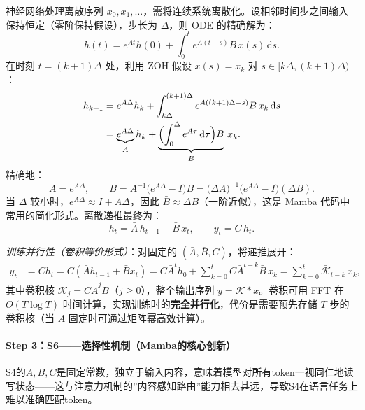 \documentclass[12pt,a4paper]{article}
\begin{document}
神经网络处理离散序列 $x_0, x_1, \ldots$，需将连续系统离散化。设相邻时间步之间输入保持恒定（零阶保持假设），步长为 $\Delta$，则 ODE 的精确解为：
\begin{equation}
h(t) = e^{At} h(0) + \int_0^t e^{A(t-s)} B\, x(s)\,\mathrm{d}s.
\end{equation}
在时刻 $t = (k+1)\Delta$ 处，利用 ZOH 假设 $x(s) = x_k$ 对 $s \in [k\Delta, (k+1)\Delta)$：
\begin{align}
h_{k+1} &= e^{A\Delta} h_k + \int_{k\Delta}^{(k+1)\Delta} e^{A((k+1)\Delta - s)} B\, x_k\,\mathrm{d}s\\
&= \underbrace{e^{A\Delta}}_{\bar{A}} h_k + \underbrace{\Bigl(\int_0^{\Delta} e^{A\tau}\,\mathrm{d}\tau\Bigr) B}_{\bar{B}}\, x_k.
\end{align}
精确地：
\begin{equation}
\bar{A} = e^{A\Delta},\qquad
\bar{B} = A^{-1}\bigl(e^{A\Delta} - I\bigr) B = \bigl(\Delta A\bigr)^{-1}\bigl(e^{A\Delta} - I\bigr)(\Delta B).
\end{equation}
当 $\Delta$ 较小时，$e^{A\Delta} \approx I + A\Delta$，因此 $\bar{B} \approx \Delta B$（一阶近似），这是 Mamba 代码中常用的简化形式。离散递推最终为：
\begin{equation}
\boxed{h_t = \bar{A}\, h_{t-1} + \bar{B}\, x_t,\qquad y_t = C\, h_t.}
\end{equation}

\textit{训练并行性（卷积等价形式）}：对固定的 $(\bar{A}, \bar{B}, C)$，将递推展开：
\begin{align}
y_t &= C h_t = C(\bar{A} h_{t-1} + \bar{B} x_t)
= C\bar{A}^t h_0 + \sum_{k=0}^{t} C\bar{A}^{t-k} \bar{B}\, x_k
= \sum_{k=0}^{t} \bar{\mathcal{K}}_{t-k}\, x_k,
\end{align}
其中卷积核 $\bar{\mathcal{K}}_j = C\bar{A}^j\bar{B}$（$j \ge 0$），整个输出序列 $y = \bar{\mathcal{K}} * x$。卷积可用 FFT 在 $O(T\log T)$ 时间计算，实现训练时的\textbf{完全并行化}，代价是需要预先存储 $T$ 步的卷积核（当 $\bar{A}$ 固定时可通过矩阵幂高效计算）。

\paragraph{Step 3：S6——选择性机制（Mamba的核心创新）}

S4的$A, B, C$是固定常数，独立于输入内容，意味着模型对所有token一视同仁地读写状态——这与注意力机制的”内容感知路由”能力相去甚远，导致S4在语言任务上难以准确匹配token。
\end{document}
